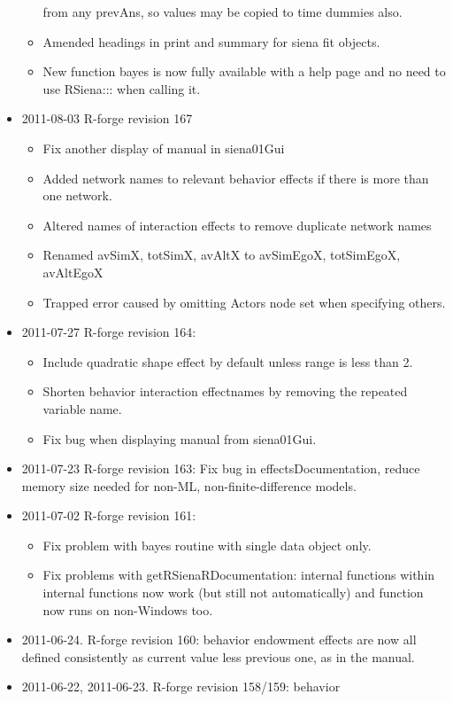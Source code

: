 \documentclass[a4paper,fleqn,11pt]{article}
\newcommand{\+}{\, + \,}
\newcommand{\sfn}[1]{\textsf{#1}}
\begin{document}
\begin{small}
\begin{itemize}
\begin{itemize}
  from any prevAns, so values may be copied to time dummies also.
\item Amended headings in print and summary for siena fit objects.
\item New function \sfn{bayes} is now fully available with a help page and no
  need to use RSiena::: when calling it.
\end{itemize}
\item 2011-08-03 R-forge revision 167
\begin{itemize}
\item Fix another display of manual in siena01Gui
\item Added network names to relevant behavior effects if there is more than one
  network.
\item Altered names of interaction effects to remove duplicate network names
\item Renamed avSimX, totSimX, avAltX to avSimEgoX, totSimEgoX, avAltEgoX
\item Trapped error caused by omitting Actors node set when specifying others.
\end{itemize}
\item 2011-07-27 R-forge revision 164:
\begin{itemize}
\item
Include quadratic shape effect by default unless range is less than 2.
\item
Shorten behavior interaction effectnames by removing the repeated variable name.
\item Fix bug when displaying manual from siena01Gui.
\end{itemize}
\item 2011-07-23 R-forge revision 163:
Fix bug in effectsDocumentation, reduce memory size needed for non-ML,
non-finite-difference models.
\item 2011-07-02 R-forge revision 161:
\begin{itemize}
\item Fix problem with \textsf{bayes} routine with single data object only.
\item Fix problems with \textsf{getRSienaRDocumentation}: internal functions within
internal functions  now work (but still not automatically)
and function now runs on non-Windows too.
\end{itemize}
\item 2011-06-24. R-forge revision 160: behavior endowment effects are now
  all defined consistently as current value less previous one, as in the manual.
\item 2011-06-22, 2011-06-23. R-forge revision 158/159: behavior

\end{itemize}
\end{small}
\end{document}
